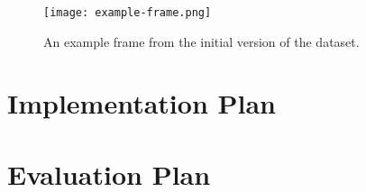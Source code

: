 \documentclass[../interim.tex]{subfiles}
\begin{document}
\begin{figure}
  \centering
  \texttt{[image: example-frame.png]}
  \caption{An example frame from the initial version of the dataset.}
  \label{fig:dataset-frame}
\end{figure}


\section{Implementation Plan}

\section{Evaluation Plan}
\end{document}
